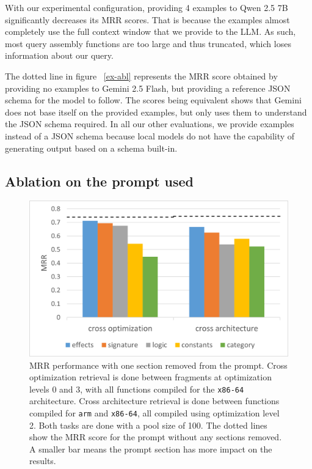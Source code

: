 With our experimental configuration, providing 4 examples to Qwen 2.5 7B significantly decreases its MRR scores. That is because
the examples almost completely use the full context window that we provide to the LLM. As such, most query assembly functions are
too large and thus truncated, which loses information about our query.

The dotted line in figure ~\ref{ex-abl} represents the MRR score obtained by providing no examples to Gemini 2.5 Flash, but providing a reference JSON
schema for the model to follow. The scores being equivalent shows that Gemini does not base itself on the provided examples, but only
uses them to understand the JSON schema required. In all our other evaluations, we provide examples instead of a JSON schema because local
models do not have the capability of generating output based on a schema built-in.

\subsection{Ablation on the prompt used}

\begin{figure}[htbp]
\centerline{\includegraphics[width=\linewidth]{prompt-ablation}}
\caption{
MRR performance with one section removed from the prompt. Cross optimization retrieval is done between fragments at
optimization levels 0 and 3, with all functions compiled for the \texttt{x86-64} architecture. Cross architecture retrieval is done between functions
compiled for \texttt{arm} and \texttt{x86-64}, all compiled using optimization level 2. Both tasks are done with a pool size of 100. The dotted lines
show the MRR score for the prompt without any sections removed. A smaller bar means the prompt section has more impact on the results.}
\label{prompt-abl}
\end{figure}

